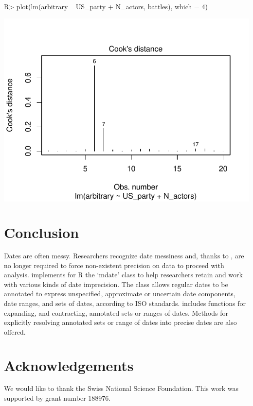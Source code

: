\documentclass[
]{jss}
\begin{document}
\begin{CodeChunk}
\begin{CodeInput}
R> plot(lm(arbitrary ~ US_party + N_actors, battles), which = 4)
\end{CodeInput}


\begin{center}\includegraphics{messydates_article_files/figure-latex/outliers-1} \end{center}

\end{CodeChunk}

\hypertarget{conclusion}{%
\section{Conclusion}\label{conclusion}}

Dates are often messy. Researchers recognize date messiness and, thanks
to , are no longer required to force non-existent
precision on data to proceed with analysis.  implements
for R the `mdate' class to help researchers retain and work with various
kinds of date imprecision. The class allows regular dates to be
annotated to express unspecified, approximate or uncertain date
components, date ranges, and sets of dates, according to ISO standards.
 includes functions for expanding, and contracting,
annotated sets or ranges of dates. Methods for explicitly resolving
annotated sets or range of dates into precise dates are also offered.

\hypertarget{acknowledgements}{%
\section{Acknowledgements}\label{acknowledgements}}

We would like to thank the Swiss National Science Foundation. This work
was supported by grant number 188976.

\renewcommand\refname{References}

\end{document}
